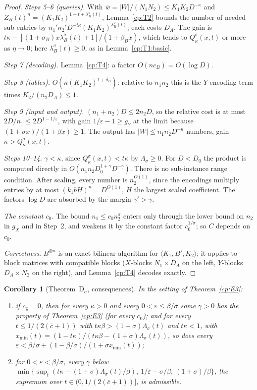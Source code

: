 \documentclass[11pt]{article}
\newtheorem{corollary}[theorem]{Corollary}
\theoremstyle{definition}
\theoremstyle{remark}
\providecommand{\eps}{\varepsilon}
\newcommand{\abs}[1]{\lvert #1\rvert}
\newcommand{\mat}[3]{\langle #1,#2,#3\rangle} %
\newcommand{\cB}{c_B}                         %
\newcommand{\ZB}{Z_B}                         %
\newcommand{\delB}{\delta_B}                  %
\newcommand{\Lam}{\Lambda}                    %
\newcommand{\cg}{c_{\mathrm g}}               %
\newcommand{\cbar}{\bar c}                    %
\newcommand{\ThmDsig}{Theorem~D\texorpdfstring{\ensuremath{_\sigma}}{\_sigma}}   %
\newcommand{\Qgain}[2]{Q^{#1}_{#2}}           %
\newcommand{\xmin}{x_{\min}}                  %
\begin{document}
\begin{proof}
\emph{Steps 5--6 (queries).} With $\bar w=\abs W/(N_1N_2)\le K_1K_2D^{-\kappa}$ and $\ZB(t)^n=(K_1K_2)^{1-t+\lambda^\sigma_B(t)}$, Lemma~\ref{cp:T2} bounds the number of needed sub-entries by $n_1'n_2'D^{-t\kappa}(K_1K_2)^{\lambda^\sigma_B(t)}$; each costs $D_A$. The gain is $t\kappa-[(1+\sigma_B)x\lambda^\sigma_B(t)+1]/(1+\beta_Bx)$, which tends to $\Qgain\sigma\kappa(x,t)$ or more as $\eta\to0$; here $\lambda^\sigma_B(t)\ge0$, as in Lemma~\ref{cp:T1:basic}.

\emph{Step 7 (decoding).} Lemma~\ref{cp:T4}: a factor $O(n\cB)=O(\log D)$.

\emph{Step 8 (tables).} $O(n(K_1K_2)^{1+\delB})$: relative to $n_1n_2$ this is the $Y$-encoding term times $K_2/(n_2D_A)\le1$.

\emph{Step 9 (input and output).} $(n_1+n_2)D\le2n_2D$, so the relative cost is at most $2D/n_1\le2D^{1-1/\eps}$, with gain $1/\eps-1\ge g_Y$ at the limit because $(1+\sigma x)/(1+\beta x)\ge1$. The output has $\abs W\le n_1n_2D^{-\kappa}$ numbers, gain $\kappa>\Qgain\sigma\kappa(x,t)$.

\emph{Steps 10--14.} $\gamma<\kappa$, since $\Qgain\sigma\kappa(x,t)<t\kappa$ by $\Lam_\sigma\ge0$. For $D<D_0$ the product is computed directly in $O(n_1n_2D_0^{1+\gamma}D^{-\gamma})$. There is no sub-instance range condition. After scaling, every number is $n_2^{O(1)}$, since the encodings multiply entries by at most $(k_1bH)^n=D^{O(1)}$, $H$ the largest scaled coefficient. The factors $\log D$ are absorbed by the margin $\gamma'>\gamma$.

\emph{The constant $c_0$.} The bound $n_1\le c_0n_2^\sigma$ enters only through the lower bound on $n_2$ in $g_X$ and in Step~2, and weakens it by the constant factor $c_0^{1/\sigma}$; so $C$ depends on $c_0$.

\emph{Correctness.} $B^{\otimes n}$ is an exact bilinear algorithm for $\mat{K_1}{B'}{K_2}$; it applies to block matrices with compatible blocks ($X$-blocks $N_1\times D_A$ on the left, $Y$-blocks $D_A\times N_2$ on the right), and Lemma~\ref{cp:T4} decodes exactly.
\end{proof}

\begin{corollary}[\ThmDsig, consequences]\label{cp:E4}
In the setting of Theorem~\ref{cp:E3}:
\begin{enumerate}[label=(\alph*)]
\item if $\cg=0$, then for every $\kappa>0$ and every $0<\eps\le\beta/\sigma$ some $\gamma>0$ has the property of Theorem~\ref{cp:E3} (for every $c_0$); and for every $t\le1/(2(\cbar+1))$ with $t\kappa\beta>(1+\sigma)\Lam_\sigma(t)$ and $t\kappa<1$, with $\xmin(t)=(1-t\kappa)/(t\kappa\beta-(1+\sigma)\Lam_\sigma(t))$, so does every $\eps<\beta/\sigma+(1-\beta/\sigma)/(1+\sigma\xmin(t))$;
\item for $0<\eps<\beta/\sigma$, every $\gamma$ below $\min\{\sup_t(t\kappa-(1+\sigma)\Lam_\sigma(t)/\beta),\ 1/\eps-\sigma/\beta,\ (1+\sigma)/\beta\}$, the supremum over $t\in(0,1/(2(\cbar+1))]$, is admissible.
\end{enumerate}
\end{corollary}
\end{document}
